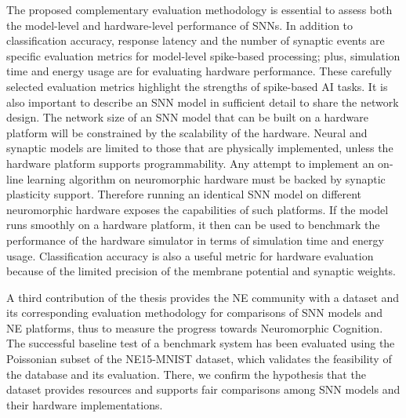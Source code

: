 The proposed complementary evaluation methodology is essential to assess both the model-level and hardware-level performance of SNNs.
In addition to classification accuracy, response latency and the number of synaptic events are specific evaluation metrics for model-level spike-based processing;
plus, simulation time and energy usage are for evaluating hardware performance.
These carefully selected evaluation metrics highlight the strengths of spike-based AI tasks.
It is also important to describe an SNN model in sufficient detail to share the network design. 
The network size of an SNN model that can be built on a hardware platform will be constrained by the scalability of the hardware.
Neural and synaptic models are limited to those that are physically implemented, unless the hardware platform supports programmability.
Any attempt to implement an on-line learning algorithm on neuromorphic hardware must be backed by synaptic plasticity support.
Therefore running an identical SNN model on different neuromorphic hardware exposes the capabilities of such platforms.
If the model runs smoothly on a hardware platform, it then can be used to benchmark the performance of the hardware simulator in terms of simulation time and energy usage.
Classification accuracy is also a useful metric for hardware evaluation because of the limited precision of the membrane potential and synaptic weights.


A third contribution of the thesis provides the NE community with a dataset and its corresponding evaluation methodology for comparisons of SNN models and NE platforms, thus to measure the progress towards Neuromorphic Cognition.
The successful baseline test of a benchmark system has been evaluated using the Poissonian subset of the NE15-MNIST dataset, which validates the feasibility of the database and its evaluation.
There, we confirm the hypothesis that the dataset provides resources and supports fair comparisons among SNN models and their hardware implementations.

